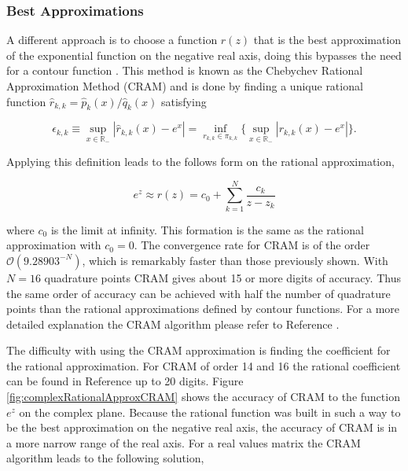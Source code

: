 \subsubsection{Best Approximations}
A different approach is to choose a function $r(z)$ that is the best approximation of the exponential function on the negative real axis, doing this bypasses the need for a contour function \cite{pusaThesis} \cite{Trefethen2006}. This method is known as the Chebychev Rational Approximation Method (CRAM) and is done by finding a unique rational function $\hat{r}_{k,k} = \hat{p}_{k}(x)/\hat{q}_{k}(x)$ satisfying 

\begin{equation}
    \epsilon_{k,k} \equiv \sup_{x \in \mathbb{R}_{-}} |\hat{r}_{k,k}(x) - e^{x}| = \inf_{r_{k,k} \in \pi_{k,k}}\bigg\{ \sup_{x \in \mathbb{R}_{-}} |r_{k,k}(x) - e^{x}|\bigg\}.
\end{equation}

\noindent Applying this definition leads to the follows form on the rational approximation,

\begin{equation}
    e^{z} \approx r(z) = c_{0} + \sum_{k=1}^{N}\frac{c_{k}}{z - z_{k}}
\end{equation}


\noindent where $c_{0}$ is the limit at infinity. This formation is the same as the rational approximation with $c_{0} = 0$. The convergence rate for CRAM is of the order $\mathcal{O}(9.28903^{-N} )$, which is remarkably faster than those previously shown. With $N=16$ quadrature points CRAM gives about 15 or more digits of accuracy. Thus the same order of accuracy can be achieved with half the number of quadrature points than the rational approximations defined by contour functions. For a more detailed explanation the CRAM algorithm please refer to Reference \cite{pusaThesis}. 

The difficulty with using the CRAM approximation is finding the coefficient for the rational approximation. For CRAM of order 14 and 16 the rational coefficient can be found in Reference \cite{pusa2011} up to 20 digits. Figure \ref{fig:complexRationalApproxCRAM} shows the accuracy of CRAM to the function $e^{z}$ on the complex plane. Because the rational function was built in such a way to be the best approximation on the negative real axis, the accuracy of CRAM is in a more narrow range of the real axis. For a real values matrix the CRAM algorithm leads to the following solution,



